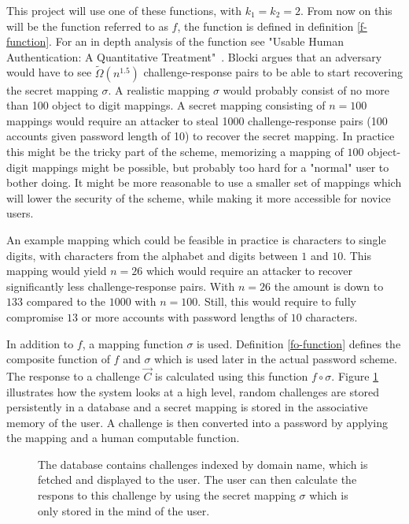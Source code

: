 \par This project will use one of these functions, with $k_1=k_2=2$. From now on this will be the function referred to as $f$, the function is defined in definition \ref{f-function}. For an in depth analysis of the function see "Usable Human Authentication: A Quantitative Treatment"~\cite{Blocki2014}. Blocki argues that an adversary would have to see $\tilde \Omega(n^{1.5})$ challenge-response pairs to be able to start recovering the secret mapping $\sigma$. A realistic mapping $\sigma$ would probably consist of no more than 100 object to digit mappings. A secret mapping consisting of $n=100$ mappings would require an attacker to steal 1000 challenge-response pairs (100 accounts given password length of 10) to recover the secret mapping. In practice this might be the tricky part of the scheme, memorizing a mapping of $100$ object-digit mappings might be possible, but probably too hard for a "normal" user to bother doing. It might be more reasonable to use a smaller set of mappings which will lower the security of the scheme, while making it more accessible for novice users. 
\par An example mapping which could be feasible in practice is characters to single digits, with characters from the alphabet and digits between $1$ and $10$. This mapping would yield $n=26$ which would require an attacker to recover significantly less challenge-response pairs. With $n=26$ the amount is down to $133$ compared to the $1000$ with $n=100$. Still, this would require to fully compromise $13$ or more accounts with password lengths of $10$ characters. 
\par In addition to $f$, a mapping function $\sigma$ is used. Definition \ref{fo-function} defines the composite function of $f$ and $\sigma$ which is used later in the actual password scheme. The response to a challenge $\vec C$ is calculated using this function $f \circ \sigma$. Figure \ref{pw-flow} illustrates how the system looks at a high level, random challenges are stored persistently in a database and a secret mapping is stored in the associative memory of the user. A challenge is then converted into a password by applying the mapping and a human computable function.



\begin{figure}[h]
    \centering
    \caption{The database contains challenges indexed by domain name, which is fetched and displayed to the user. The user can then calculate the respons to this challenge by using the secret mapping $\sigma$ which is only stored in the mind of the user.}
    \label{pw-flow}
\end{figure}



